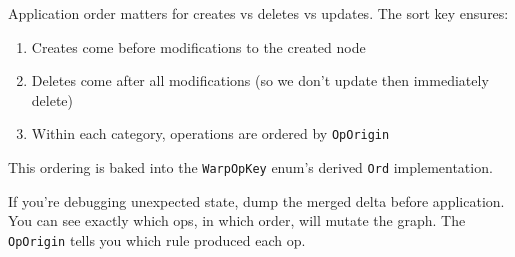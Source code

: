 \begin{commentary}
Application order matters for creates vs deletes vs updates. The sort key ensures:
\begin{enumerate}
    \item Creates come before modifications to the created node
    \item Deletes come after all modifications (so we don't update then immediately delete)
    \item Within each category, operations are ordered by \texttt{OpOrigin}
\end{enumerate}

This ordering is baked into the \texttt{WarpOpKey} enum's derived \texttt{Ord} implementation.
\end{commentary}

\begin{protip}
If you're debugging unexpected state, dump the merged delta before application. You can see exactly which ops, in which order, will mutate the graph. The \texttt{OpOrigin} tells you which rule produced each op.
\end{protip}
